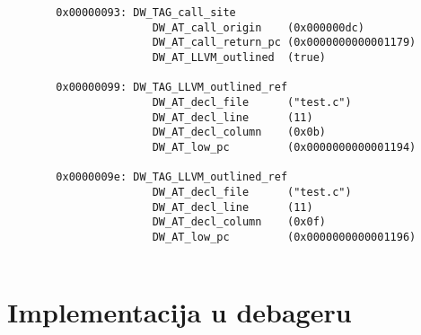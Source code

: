 \documentclass[12pt,oneside]{memoir}
\begin{document}




\begin{figure}
\begin{verbatim}
  0x00000093: DW_TAG_call_site
                 DW_AT_call_origin    (0x000000dc)
                 DW_AT_call_return_pc (0x0000000000001179)
                 DW_AT_LLVM_outlined  (true)
  
  0x00000099: DW_TAG_LLVM_outlined_ref
                 DW_AT_decl_file      ("test.c")
                 DW_AT_decl_line      (11)
                 DW_AT_decl_column    (0x0b)
                 DW_AT_low_pc         (0x0000000000001194)
  
  0x0000009e: DW_TAG_LLVM_outlined_ref
                 DW_AT_decl_file      ("test.c")
                 DW_AT_decl_line      (11)
                 DW_AT_decl_column    (0x0f)
                 DW_AT_low_pc         (0x0000000000001196)
  
  \end{verbatim}
  \label{lst:outlining_asm_example}
  \caption{}
\end{figure}

\section{Implementacija u debageru}

\end{document}
